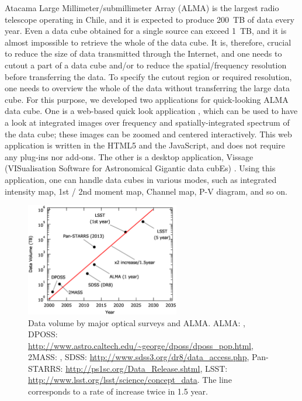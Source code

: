 Atacama Large Millimeter/submillimeter Array (ALMA) is the largest radio 
telescope operating in Chile, and it is expected to produce 200~TB of 
data every year. 
Even a data cube obtained for a single source can exceed 1~TB, and it 
is almost impossible to retrieve the whole of the data cube. 
It is, therefore, crucial to reduce the size of data transmitted through 
the Internet, and one needs to cutout a part of a data cube and/or to 
reduce the spatial/frequency resolution before transferring the data. 
To specify the cutout region or required resolution, one needs to overview
the whole of the data without transferring the large data cube. 
For this purpose, we developed two applications for quick-looking ALMA data cube. 
One is a web-based quick look application \citep{O10_adassxxii}, 
which can be used to have a look at integrated images over frequency and 
spatially-integrated spectrum of the data cube; these images can be zoomed 
and centered interactively. 
This web application is written in the HTML5 and the JavaScript, and does 
not require any plug-ins nor add-ons. 
The other is a desktop application, Vissage (VISualisation Software for 
Astronomical Gigantic data cubEs) \citep{P047_adassxxii}. 
Using this application, one can handle data cubes in various modes, such 
as integrated intensity map, 1st / 2nd moment map, Channel map, P-V diagram, 
and so on. 

\begin{figure}
\begin{center}
\includegraphics[width = 0.6\textwidth]{part11/Shirasaki_D5/D5_f1.eps}
\caption{Data volume by major optical surveys and ALMA.
ALMA: \citet{Lacy_2011},
DPOSS: \protect\url{http://www.astro.caltech.edu/~george/dposs/dposs_pop.html},
2MASS: \citet{Skrutskie_2006},
SDSS: \protect\url{http://www.sdss3.org/dr8/data_access.php},
Pan-STARRS: \protect\url{http://ps1sc.org/Data_Release.shtml},
LSST: \protect\url{http://www.lsst.org/lsst/science/concept_data}.
The line corresponds to a rate of increase twice in 1.5 year.
}
\label{Shfig:1}
\end{center}
\end{figure}

